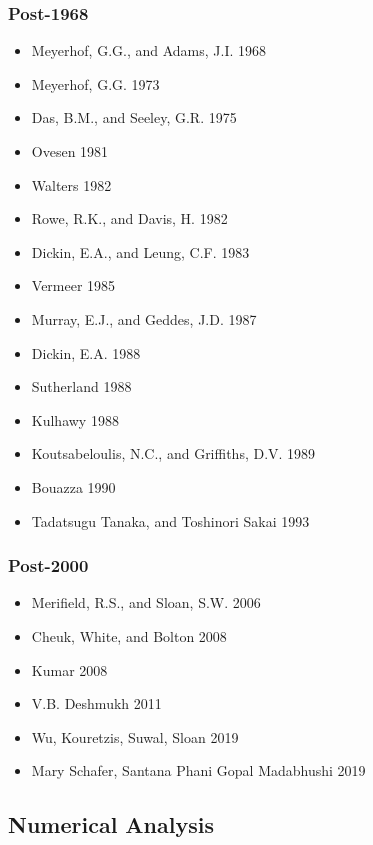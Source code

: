 \documentclass[a4paper, nobind]{templates/ociamthesis}
\providecommand{\tightlist}{%
  \setlength{\itemsep}{0pt}\setlength{\parskip}{0pt}}
\begin{document}
\hypertarget{post-1968}{%
\subsubsection{Post-1968}\label{post-1968}}

\begin{itemize}
\tightlist
\item
  Meyerhof, G.G., and Adams, J.I. 1968
\item
  Meyerhof, G.G. 1973
\item
  Das, B.M., and Seeley, G.R. 1975
\item
  Ovesen 1981
\item
  Walters 1982
\item
  Rowe, R.K., and Davis, H. 1982
\item
  Dickin, E.A., and Leung, C.F. 1983
\item
  Vermeer 1985
\item
  Murray, E.J., and Geddes, J.D. 1987
\item
  Dickin, E.A. 1988
\item
  Sutherland 1988
\item
  Kulhawy 1988
\item
  Koutsabeloulis, N.C., and Griffiths, D.V. 1989
\item
  Bouazza 1990
\item
  Tadatsugu Tanaka, and Toshinori Sakai 1993
\end{itemize}

\hypertarget{post-2000}{%
\subsubsection{Post-2000}\label{post-2000}}

\begin{itemize}
\tightlist
\item
  Merifield, R.S., and Sloan, S.W. 2006
\item
  Cheuk, White, and Bolton 2008
\item
  Kumar 2008
\item
  V.B. Deshmukh 2011
\item
  Wu, Kouretzis, Suwal, Sloan 2019
\item
  Mary Schafer, Santana Phani Gopal Madabhushi 2019
\end{itemize}

\hypertarget{numerical-analysis}{%
\subsection{Numerical Analysis}\label{numerical-analysis}}
\end{document}
